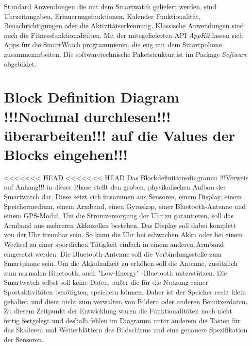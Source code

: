 Standard Anwendungen die mit dem Smartwatch geliefert werden, sind Uhrzeitangaben, Erinnerungsfunktionen, Kalender Funktionalität, Benachrichtigungen oder die Aktivitätserkennung. Klassische Anwendungen sind auch die Fitnessfunktionalitäten.
Mit der mitegelieferten API \textit{AppKit} lassen sich Apps für die SmartWatch programmieren, die eng mit dem Smartpohone zusammenarbeiten.
Die softwaretechnische Paketstruktur ist im Package \textit{Software} abgebildet.

\section{Block Definition Diagram !!!Nochmal durchlesen!!!überarbeiten!!! auf die Values der Blocks eingehen!!!}
<<<<<<< HEAD
<<<<<<< HEAD
Das Blockdefinitionsdiagramm !!!Verweis auf Anhang!!! in dieser Phase stellt den groben, physikalischen Aufbau der Smartwatch dar. Diese setzt sich zusammen aus Sensoren, einem Display, einem Speichermedium, einem Armband, einen Gyroskop, einer Bluetooth-Antenne und einem GPS-Modul. Um die Stromversorgung der Uhr zu garantieren, soll das Armband aus mehreren Akkuzellen bestehen. Das Display soll dabei komplett von der Uhr trennbar sein. So kann die Uhr bei schwachen Akku oder bei einem Wechsel zu einer sportlichen Tätigkeit einfach in einem anderen Armband eingesetzt werden. Die Bluetooth-Antenne soll die Verbindungsstelle zum Smartphone sein. Um die Akkulaufzeit zu erhöhen soll die Antenne, zusätzlich zum normalen Bluetooth, auch "Low-Energy" -Bluetooth unterstützen. Die Smartwatch selbst soll keine Daten, außer die für die Nutzung reiner Sportaktivitäten benötigten, speichern können. Daher ist der Speicher recht klein gehalten und dient nicht zum verwalten von Bildern oder anderen Benutzerdaten. 
Zu diesem Zeitpunkt der Entwicklung waren die Funktionalitäten noch nicht fertig festgelegt und deshalb fehlen im Diagramm unter anderem die Tasten für das Skalieren und Weiterblättern des Bildschirms und eine genauere Spezifikation der Sensoren. 

